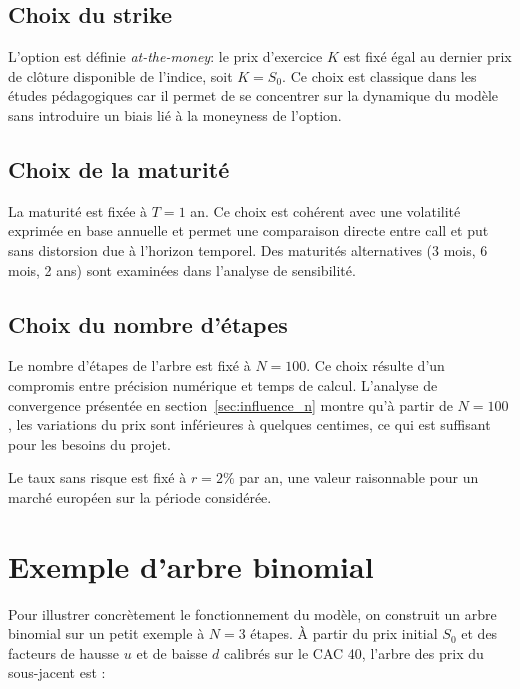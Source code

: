 \documentclass[11pt]{report}
\begin{document}
\subsection{Choix du strike}

L'option est définie \textit{at-the-money}: le prix d'exercice $K$ est fixé
égal au dernier prix de clôture disponible de l'indice, soit $K = S_0$.
Ce choix est classique dans les études pédagogiques car il permet de se
concentrer sur la dynamique du modèle sans introduire un biais lié à la
moneyness de l'option.

\subsection{Choix de la maturité}

La maturité est fixée à $T = 1$ an. Ce choix est cohérent avec une volatilité exprimée en base annuelle et permet une comparaison directe entre call et put sans distorsion due à l'horizon temporel. Des maturités alternatives (3 mois, 6 mois, 2 ans) sont examinées dans l'analyse de sensibilité.

\subsection{Choix du nombre d'étapes}

Le nombre d'étapes de l'arbre est fixé à $N = 100$. Ce choix résulte d'un compromis entre précision numérique et temps de calcul. L'analyse de convergence présentée en section~\ref{sec:influence_n} montre qu'à partir de $N = 100$, les variations du prix sont inférieures à quelques centimes, ce qui est suffisant pour les besoins du projet.

Le taux sans risque est fixé à $r = 2\%$ par an, une valeur raisonnable pour un marché européen sur la période considérée.

\section{Exemple d'arbre binomial}

Pour illustrer concrètement le fonctionnement du modèle, on construit un
arbre binomial sur un petit exemple à $N = 3$ étapes. À partir du prix
initial $S_0$ et des facteurs de hausse $u$ et de baisse $d$ calibrés
sur le CAC 40, l'arbre des prix du sous-jacent est :
\end{document}
